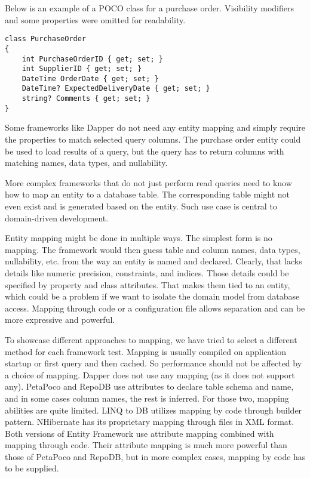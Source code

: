 Below is an example of a POCO class for a purchase order. Visibility modifiers and some properties were omitted for readability. 


\begin{lstlisting}[language=CSharp]
class PurchaseOrder
{
    int PurchaseOrderID { get; set; }
    int SupplierID { get; set; }
    DateTime OrderDate { get; set; }
    DateTime? ExpectedDeliveryDate { get; set; }
    string? Comments { get; set; }
}
\end{lstlisting}

Some frameworks like Dapper do not need any entity mapping and simply require the properties to match selected query columns. The purchase order entity could be used to load results of a query, but the query has to return columns with matching names, data types, and nullability.

More complex frameworks that do not just perform read queries need to know how to map an entity to a database table. The corresponding table might not even exist and is generated based on the entity. Such use case is central to domain-driven development\cite{FowlerDDD}.

Entity mapping might be done in multiple ways. The simplest form is no mapping. The framework would then guess table and column names, data types, nullability, etc. from the way an entity is named and declared. Clearly, that lacks details like numeric precision, constraints, and indices.
Those details could be specified by property and class attributes. That makes them tied to an entity, which could be a problem if we want to isolate the domain model from database access. 
Mapping through code or a configuration file allows separation and can be more expressive and powerful.

To showcase different approaches to mapping, we have tried to select a different method for each framework test. Mapping is usually compiled on application startup or first query and then cached. So performance should not be affected by a choice of mapping. Dapper does not use any mapping (as it does not support any). PetaPoco and RepoDB use attributes to declare table schema and name, and in some cases column names, the rest is inferred. For those two, mapping abilities are quite limited. LINQ to DB utilizes mapping by code through builder pattern. NHibernate has its proprietary mapping through files in XML format. Both versions of Entity Framework use attribute mapping combined with mapping through code. Their attribute mapping is much more powerful than those of PetaPoco and RepoDB, but in more complex cases, mapping by code has to be supplied.

